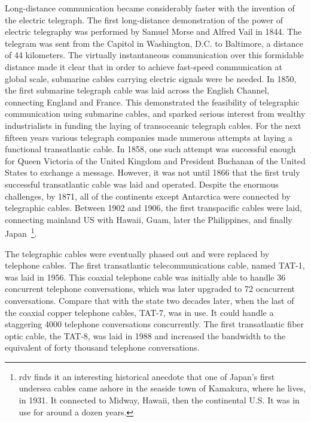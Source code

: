 Long-distance communication became considerably faster with the invention of the electric telegraph.
The first long-distance demonstration of the power of electric telegraphy was performed by Samuel Morse and Alfred Vail in 1844.
The telegram was sent from the Capitol in Washington, D.C. to Baltimore, a distance of 44 kilometers.
The virtually instantaneous communication over this formidable distance made it clear that in order to achieve fast-speed communication at global scale, submarine cables carrying electric signals were be needed.
In 1850, the first submarine telegraph cable was laid across the English Channel, connecting England and France.
This demonstrated the feasibility of telegraphic communication using submarine cables, and sparked serious interest from wealthy industrialists in funding the laying of transoceanic telegraph cables.
For the next fifteen years various telegraph companies made numerous attempts at laying a functional transatlantic cable.
In 1858, one such attempt was successful enough for Queen Victoria of the United Kingdom and President Buchanan of the United States to exchange a message. 
However, it was not until 1866 that the first truly successful transatlantic cable was laid and operated.
Despite the enormous challenges, by 1871, all of the continents except Antarctica were connected by telegraphic cables.
Between 1902 and 1906, the first transpacific cables were laid, connecting mainland US with Hawaii, Guam, later the Philippines, and finally Japan~\footnote{rdv finds it an interesting historical anecdote that one of Japan's first undersea cables came ashore in the seaside town of Kamakura, where he lives, in 1931.  It connected to Midway, Hawaii, then the continental U.S. It was in use for around a dozen years.}.

The telegraphic cables were eventually phased out and were replaced by telephone cables.
The first transatlantic telecommunications cable, named TAT-1, was laid in 1956.
This coaxial telephone cable was initially able to handle 36 concurrent telephone conversations, which was later upgraded to 72 ocncurrent conversations. 
Compare that with the state two decades later, when the last of the coaxial copper telephone cables, TAT-7, was in use.
It could handle a staggering 4000 telephone conversations concurrently.
The first transatlantic fiber optic cable, the TAT-8, was laid in 1988 and increased the bandwidth to the equivalent of forty thousand telephone conversations.

